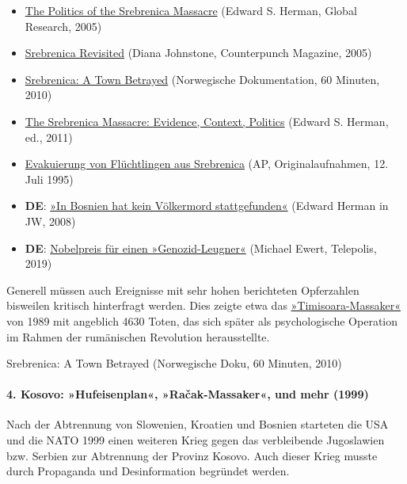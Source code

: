 \begin{itemize}
\tightlist
\item
  \href{https://www.globalresearch.ca/the-politics-of-the-srebrenica-massacre/660}{The
  Politics of the Srebrenica Massacre} (Edward S. Herman, Global
  Research, 2005)
\item
  \href{https://www.counterpunch.org/2005/10/12/srebrenica-revisited/}{Srebrenica
  Revisited} (Diana Johnstone, Counterpunch Magazine, 2005)
\item
  \href{https://www.youtube.com/watch?v=FvqHWS_4AuM}{Srebrenica: A Town
  Betrayed} (Norwegische Dokumentation, 60 Minuten, 2010)
\item
  \href{https://swprs.files.wordpress.com/2019/12/the-srebrenica-massacre_edward-herman_2011.pdf}{The
  Srebrenica Massacre: Evidence, Context, Politics} (Edward S. Herman,
  ed., 2011)
\item
  \href{https://www.youtube.com/watch?v=KmkV7zHiHoQ}{Evakuierung von
  Flüchtlingen aus Srebrenica} (AP, Originalaufnahmen, 12. Juli 1995)
\item
  \textbf{DE}:
  \href{https://swprs.files.wordpress.com/2019/12/srebrenica_edward-herman_junge-welt_interview_2008.pdf}{»In
  Bosnien hat kein Völkermord stattgefunden«} (Edward Herman in JW,
  2008)
\item
  \textbf{DE}:
  \href{https://www.heise.de/tp/features/Nobelpreis-fuer-einen-Genozid-Leugner-4608176.html?seite=all}{Nobelpreis
  für einen »Genozid-Leugner«} (Michael Ewert, Telepolis, 2019)
\end{itemize}

Generell müssen auch Ereignisse mit sehr hohen berichteten Opferzahlen
bisweilen kritisch hinter­fragt werden. Dies zeigte etwa das
\href{https://www.france24.com/en/20091220-twenty-years-later-timisoara-affair-exposes-media-credulity}{»Timisoara-Massaker«}
von 1989 mit angeblich 4630 Toten, das sich später als psychologische
Operation im Rahmen der rumänischen Revolution herausstellte.

Srebrenica: A Town Betrayed (Norwegische Doku, 60 Minuten, 2010)

\hypertarget{4-kosovo-hufeisenplan-raux10dak-massaker-und-mehr-1999}{%
\paragraph{4. Kosovo: »Hufeisenplan«, »Račak-Massaker«, und mehr
(1999)}\label{4-kosovo-hufeisenplan-raux10dak-massaker-und-mehr-1999}}

Nach der Abtrennung von Slowenien, Kroatien und Bosnien starteten die
USA und die NATO 1999 einen weiteren Krieg gegen das verbleibende
Jugoslawien bzw. Serbien zur Abtrennung der Provinz Kosovo. Auch dieser
Krieg musste durch Propaganda und Desinformation begründet werden.

